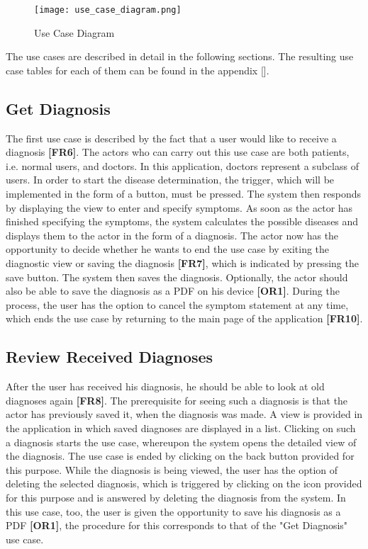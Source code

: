 \begin{figure}[h]
	\centering
	\texttt{[image: use\_case\_diagram.png]}
	\caption[Use Case Diagram]{Use Case Diagram}
\end{figure}
\noindent
The use cases are described in detail in the following sections. The resulting use case tables for each of them can be found in the appendix [].

\subsection{Get Diagnosis}
The first use case is described by the fact that a user would like to receive a diagnosis \textbf{[FR6]}. The actors who can carry out this use case are both patients, i.e. normal users, and doctors. In this application, doctors represent a subclass of users. In order to start the disease determination, the trigger, which will be implemented in the form of a button, must be pressed. The system then responds by displaying the view to enter and specify symptoms. As soon as the actor has finished specifying the symptoms, the system calculates the possible diseases and displays them to the actor in the form of a diagnosis. The actor now has the opportunity to decide whether he wants to end the use case by exiting the diagnostic view or saving the diagnosis \textbf{[FR7]}, which is indicated by pressing the save button. The system then saves the diagnosis. Optionally, the actor should also be able to save the diagnosis as a PDF on his device \textbf{[OR1]}. During the process, the user has the option to cancel the symptom statement at any time, which ends the use case by returning to the main page of the application \textbf{[FR10]}.

\subsection{Review Received Diagnoses}
After the user has received his diagnosis, he should be able to look at old diagnoses again \textbf{[FR8]}. The prerequisite for seeing such a diagnosis is that the actor has previously saved it, when the diagnosis was made. A view is provided in the application in which saved diagnoses are displayed in a list. Clicking on such a diagnosis starts the use case, whereupon the system opens the detailed view of the diagnosis. The use case is ended by clicking on the back button provided for this purpose. While the diagnosis is being viewed, the user has the option of deleting the selected diagnosis, which is triggered by clicking on the icon provided for this purpose and is answered by deleting the diagnosis from the system. In this use case, too, the user is given the opportunity to save his diagnosis as a PDF \textbf{[OR1]}, the procedure for this corresponds to that of the "Get Diagnosis" use case.

